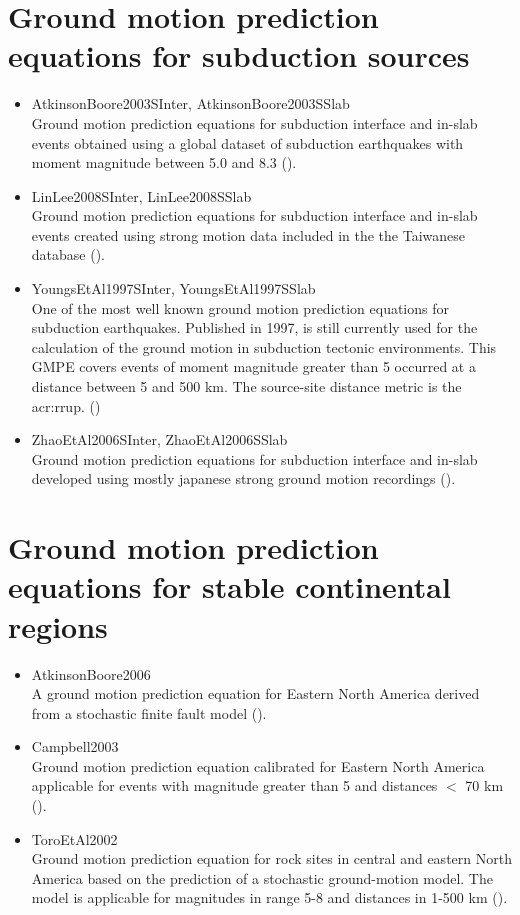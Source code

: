 \section{Ground motion prediction equations for subduction sources}
\begin{itemize}
    \item AtkinsonBoore2003SInter, AtkinsonBoore2003SSlab \hfill \\ Ground 
	    motion prediction equations for 
        subduction interface and in-slab events obtained using a global 
        dataset of subduction earthquakes with moment magnitude between 
        5.0 and 8.3 (\cite{atkinson2003}).
    \item LinLee2008SInter, LinLee2008SSlab \hfill \\ Ground motion 
	    prediction equations for subduction
        interface and in-slab events created using strong motion
        data included in the the Taiwanese database (\cite{lin2008}).
    \item YoungsEtAl1997SInter, YoungsEtAl1997SSlab \hfill \\ One of the most  
	    well known ground motion 
        prediction equations for subduction earthquakes. Published in 1997,
        is still currently used for the calculation of the ground motion 
        in subduction tectonic environments. This GMPE covers events of 
        moment magnitude greater than 5 occurred at a distance between 5
        and 500 km. The source-site distance metric is the \gls{acr:rrup}.      
		(\cite{youngs1997})
    \item ZhaoEtAl2006SInter, ZhaoEtAl2006SSlab \hfill \\ 
	    Ground motion pre\-dic\-tion
	    equa\-tions for subduction interface and in-slab developed using mostly
	    japanese strong ground motion recordings (\cite{zhao2006}).
\end{itemize}
%
\section{Ground motion prediction equations for stable continental regions}
\begin{itemize}
    \item AtkinsonBoore2006 \hfill \\ 
	A ground motion prediction equation for Eastern 
	North America derived from a stochastic finite fault model 
	(\cite{atkinson2006}).
    \item Campbell2003 \hfill \\ 
	Ground motion prediction equation calibrated for Eastern North America 
	applicable for events with magnitude greater than 5 and distances $<$ 70 km 
	(\cite{campbell2003}).
    \item ToroEtAl2002 \hfill \\ Ground motion prediction equation for rock 	
	sites in central and eastern North America
    based on the prediction of a stochastic ground-motion model. The model is 
	applicable for magnitudes in range 5-8 and distances in 1-500 km 
	(\cite{toro2002}).
\end{itemize}
